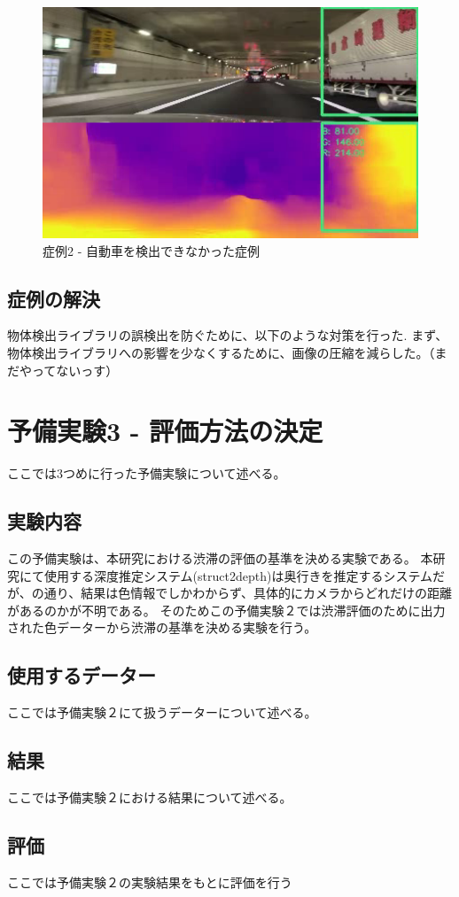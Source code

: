 \begin{figure}[hbtp]
 \begin{center}
  \includegraphics[width=12cm]{figs/miss_2.png}
 \end{center}
  \caption{症例2 - 自動車を検出できなかった症例}
  \label{fig:miss2}
\end{figure}

\newpage

\subsection{症例の解決}
物体検出ライブラリの誤検出を防ぐために、以下のような対策を行った.
まず、物体検出ライブラリへの影響を少なくするために、画像の圧縮を減らした。（まだやってないっす）


\newpage

\section{予備実験3 - 評価方法の決定}
ここでは3つめに行った予備実験について述べる。
\subsection{実験内容}
この予備実験は、本研究における渋滞の評価の基準を決める実験である。
本研究にて使用する深度推定システム(struct2depth)\cite{casser2019struct2depth}は奥行きを推定するシステムだが、の通り、結果は色情報でしかわからず、具体的にカメラからどれだけの距離があるのかが不明である。
そのためこの予備実験２では渋滞評価のために出力された色データーから渋滞の基準を決める実験を行う。

\subsection{使用するデーター}
ここでは予備実験２にて扱うデーターについて述べる。

\subsection{結果}
ここでは予備実験２における結果について述べる。

\subsection{評価}
ここでは予備実験２の実験結果をもとに評価を行う
